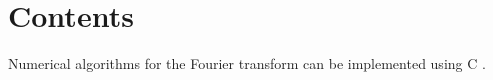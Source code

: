 \documentclass[a4paper]{report}
\begin{document}
\chapter{Contents}
Numerical algorithms for the Fourier transform \cite{weisstein16}
can be implemented using C \cite{kernighan88}.

\end{document}
